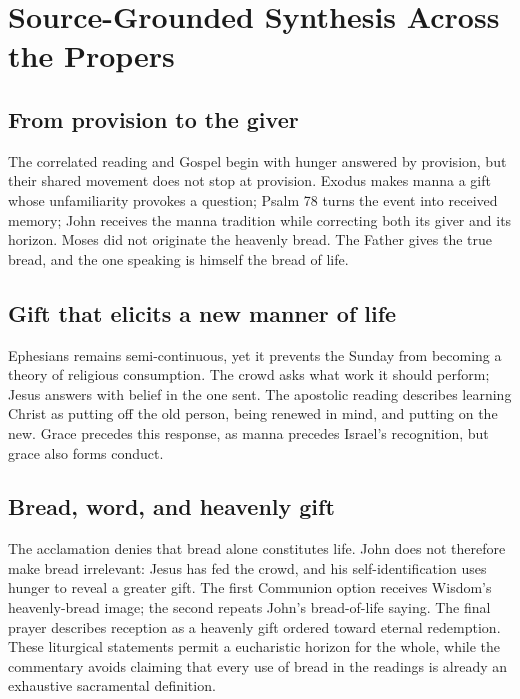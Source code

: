 \section*{Source-Grounded Synthesis Across the Propers}

\subsection*{From provision to the giver}

The correlated reading and Gospel begin with hunger answered by provision,
but their shared movement does not stop at provision. Exodus makes manna a
gift whose unfamiliarity provokes a question; Psalm 78 turns the event into
received memory; John receives the manna tradition while correcting both its
giver and its horizon. Moses did not originate the heavenly bread. The Father
gives the true bread, and the one speaking is himself the bread of life.

\subsection*{Gift that elicits a new manner of life}

Ephesians remains semi-continuous, yet it prevents the Sunday from becoming a
theory of religious consumption. The crowd asks what work it should perform;
Jesus answers with belief in the one sent. The apostolic reading describes
learning Christ as putting off the old person, being renewed in mind, and
putting on the new. Grace precedes this response, as manna precedes Israel's
recognition, but grace also forms conduct.

\subsection*{Bread, word, and heavenly gift}

The acclamation denies that bread alone constitutes life. John does not
therefore make bread irrelevant: Jesus has fed the crowd, and his
self-identification uses hunger to reveal a greater gift. The first Communion
option receives Wisdom's heavenly-bread image; the second repeats John's
bread-of-life saying. The final prayer describes reception as a heavenly gift
ordered toward eternal redemption. These liturgical statements permit a
eucharistic horizon for the whole, while the commentary avoids claiming that
every use of bread in the readings is already an exhaustive sacramental
definition.

